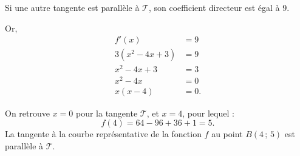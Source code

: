 Si une autre tangente est parallèle à \(\mathcal{T}\), son coefficient directeur est égal à 9.

Or,
\begin{align*}
f'(x) &= 9 \\
3(x^2 - 4x + 3) &= 9 \\
x^2 - 4x + 3 &= 3 \\
x^2 - 4x &= 0 \\
x(x - 4) &= 0.
\end{align*}

On retrouve \(x = 0\) pour la tangente \(\mathcal{T}\), et \(x = 4\), pour lequel :
\[
f(4) = 64 - 96 + 36 + 1 = 5.
\]  
La tangente à la courbe représentative de la fonction \(f\) au point \(B(4\,;\,5)\) est parallèle à \(\mathcal{T}\).
